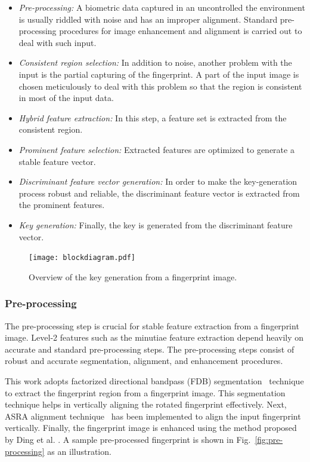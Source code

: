 \begin{itemize}
	\item \emph{Pre-processing:} A biometric data captured in an uncontrolled
	      the environment is usually riddled with noise and has an improper alignment.
	      Standard pre-processing procedures for image enhancement and alignment is carried out to deal with such input.
	\item \emph{Consistent region selection:}  In addition to noise, another
	      problem with the input is the partial capturing of the fingerprint. A
	      part of the input image is chosen meticulously to deal with this
	      problem so that the region is consistent in most of the input data.
	\item \emph{Hybrid feature extraction:} In this step, a feature set is
	      extracted from the consistent region.
	\item \emph{Prominent feature selection:} Extracted features are optimized
	      to generate a stable feature vector.
	\item \emph{Discriminant feature vector generation:} In order to make the
	      key-generation process robust and reliable,
	      the discriminant feature vector is extracted from the prominent features.
	\item \emph{Key generation:} Finally, the key is generated from the
	      discriminant feature vector.
\end{itemize}

\begin{figure}[!ht]
	\centering
	\texttt{[image: blockdiagram.pdf]}
	\caption{Overview of the key generation from a fingerprint image.}
	\label{fig:blockdiagram}
\end{figure}



\subsubsection{Pre-processing}
The pre-processing step is crucial for stable feature extraction from a
fingerprint image. Level-2 features such as the minutiae feature extraction
depend heavily on accurate and standard pre-processing steps. The
pre-processing steps consist of robust and accurate segmentation, alignment,
and enhancement procedures.

\par

This work adopts factorized directional bandpass
(FDB) segmentation~\cite{thai2016filter} technique to extract the fingerprint
region from a fingerprint image. This segmentation technique helps in vertically
aligning the rotated fingerprint effectively. Next, ASRA alignment
technique~\cite{Faguletal} has been implemented to align the input fingerprint
vertically. Finally, the fingerprint image is enhanced using the method
proposed by Ding et al. \cite{ding2017combining}. A sample pre-processed
fingerprint is shown in Fig.~\ref{fig:pre-processing} as an illustration.

